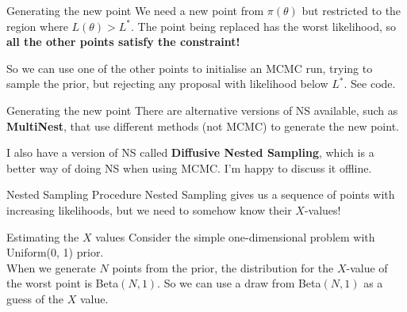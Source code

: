 \begin{frame}[t]{Generating the new point}
We need a new point from $\pi(\theta)$ but restricted to the region where $L(\theta)>L^*$. The point being replaced has the worst likelihood, so
{\bf all the other points satisfy the constraint!}
\vspace{20pt}

So we can use one of the other points to initialise an MCMC run, trying to
sample the prior, but rejecting any proposal with likelihood below $L^*$.
See code.
\end{frame}

\begin{frame}[t]{Generating the new point}
There are alternative versions of NS available, such as {\bf MultiNest}, that
use different methods (not MCMC) to generate the new point.\\
\vspace{20pt}

I also have a version of NS called {\bf Diffusive Nested Sampling}, which is
a better way of doing NS when using MCMC. I'm happy to discuss it offline.
\end{frame}


\begin{frame}[t]{Nested Sampling Procedure}
Nested Sampling gives us a sequence of points with increasing likelihoods,
but we need to somehow know their $X$-values!
\end{frame}



\begin{frame}[t]{Estimating the $X$ values}
Consider the simple one-dimensional problem with Uniform(0, 1) prior.\\

\vspace{20pt}
When we generate $N$ points from the prior, the distribution for the $X$-value
of the worst point is Beta$(N, 1)$. So we can use a draw from Beta$(N,1)$ as
a guess of the $X$ value.
\end{frame}

